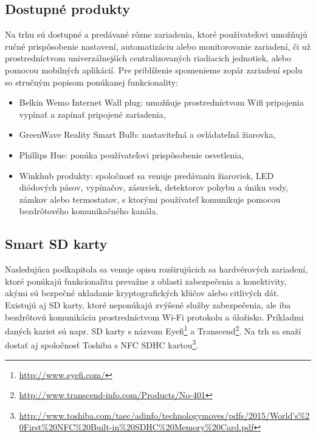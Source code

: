 \documentclass[12pt,a4paper,oneside,openright]{report}
\begin{document}
\subsection{Dostupné produkty} \label{s_devices}
Na trhu sú dostupné a predávané rôzne zariadenia, ktoré používateľovi umožňujú ručné prispôsobenie nastavení, automatizáciu alebo monitorovanie zariadení, či už prostredníctvom univerzálnejších centralizovaných riadiacich jednotiek, alebo pomocou mobilných aplikácií.
Pre priblíženie spomenieme zopár zariadení spolu so stručným popisom ponúkanej funkcionality:
\begin{itemize}
	\item Belkin Wemo Internet Wall plug: umožňuje prostredníctvom Wifi pripojenia vypínať a zapínať pripojené zariadenia,
	\item GreenWave Reality Smart Bulb: nastaviteľná a ovládateľná žiarovka,
	\item Phillips Hue: ponúka používateľovi prispôsobenie osvetlenia,
	\item Winkhub produkty: spoločnosť sa venuje predávaniu žiaroviek, LED diódových pásov, vypínačov, zásuviek, detektorov pohybu a úniku vody, zámkov alebo termostatov, s ktorými používateľ komunikuje pomocou bezdrôtového komunikačného kanála.
\end{itemize}
\onehalfspacing


\subsection{Smart SD karty}
Nasledujúca podkapitola sa venuje opisu rozširujúcich sa hardvérových zariadení, ktoré ponúkajú funkcionalitu prevažne z oblasti zabezpečenia a konektivity, akými sú bezpečné ukladanie kryptografických kľúčov alebo citlivých dát.
Existujú aj SD karty, ktoré neponúkajú zvýšené služby zabezpečenia, ale iba bezdrôtovú komunikáciu prostredníctvom Wi-Fi protokolu a úložisko. Príkladmi daných kariet sú napr. SD karty s názvom Eyefi\footnote{\url{http://www.eyefi.com/}} a Transcend\footnote{\url{http://www.transcend-info.com/Products/No-401}}. Na trh sa snaží dostať aj spoločnosť Toshiba s NFC SDHC  kartou\footnote{\url{http://www.toshiba.com/taec/adinfo/technologymoves/pdfs/2015/World's\%20First\%20NFC\%20Built-in\%20SDHC\%20Memory\%20Card.pdf}}.
\end{document}
